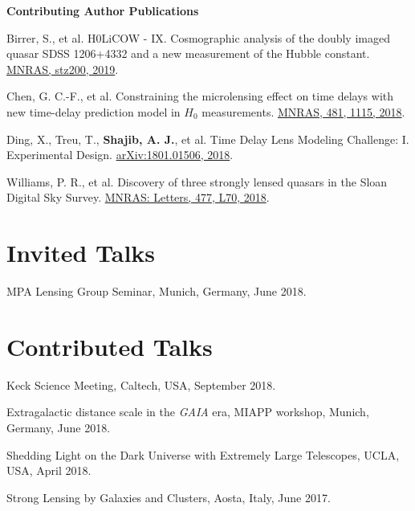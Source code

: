 \documentclass[margin,line]{res}
\begin{document}
\begin{resume}
\textbf{Contributing Author Publications} \\
\begin{etaremune}
	\item Birrer, S., et al. H0LiCOW - IX. Cosmographic analysis of the doubly imaged quasar SDSS 1206+4332 and a new measurement of the Hubble constant. \href{https://doi.org/10.1093/mnras/stz200}{MNRAS, stz200, 2019}.
	\item Chen, G. C.-F., et al. Constraining the microlensing effect on time delays with new time-delay prediction model in $H_0$ measurements. \href{https://doi.org/10.1093/mnras/sty2350}{MNRAS, 481, 1115, 2018}.
	\item Ding, X., Treu, T., {\bf Shajib, A. J.}, et al. Time Delay Lens Modeling Challenge: I. Experimental Design. \href{https://arxiv.org/abs/1801.01506}{arXiv:1801.01506, 2018}.
 	\item Williams, P. R., et al. Discovery of three strongly lensed quasars in the Sloan Digital Sky Survey. \href{https://doi.org/10.1093/mnrasl/sly043}{MNRAS: Letters, 477, L70, 2018}.
\end{etaremune}


\section{\sc Invited Talks}
\begin{etaremune}
	\item MPA Lensing Group Seminar, Munich, Germany, June 2018.
\end{etaremune}


\section{\sc Contributed Talks}
\begin{etaremune}
	\item Keck Science Meeting, Caltech, USA, September 2018.
	\item Extragalactic distance scale in the \textit{GAIA} era, MIAPP workshop, Munich, Germany, June 2018.
	\item Shedding Light on the Dark Universe with Extremely Large Telescopes, UCLA, USA, April 2018.
	\item Strong Lensing by Galaxies and Clusters, Aosta, Italy, June 2017.
\end{etaremune}


\end{resume}
\end{document}
